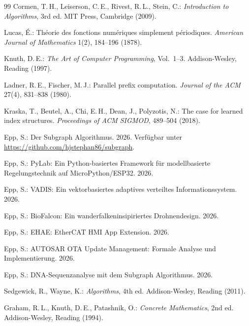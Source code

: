 ﻿\documentclass[12pt, a4paper]{article}
\theoremstyle{plain}
\theoremstyle{definition}
\theoremstyle{remark}
\begin{document}
\begin{thebibliography}{99}
    Cormen, T.\,H., Leiserson, C.\,E., Rivest, R.\,L., Stein, C.:
    \textit{Introduction to Algorithms}, 3rd ed.
    MIT Press, Cambridge (2009).

    Lucas, É.:
    Théorie des fonctions numériques simplement périodiques.
    \textit{American Journal of Mathematics} 1(2), 184--196 (1878).

    Knuth, D.\,E.:
    \textit{The Art of Computer Programming}, Vol.\ 1--3.
    Addison-Wesley, Reading (1997).

    Ladner, R.\,E., Fischer, M.\,J.:
    Parallel prefix computation.
    \textit{Journal of the ACM} 27(4), 831--838 (1980).

    Kraska, T., Beutel, A., Chi, E.\,H., Dean, J., Polyzotis, N.:
    The case for learned index structures.
    \textit{Proceedings of ACM SIGMOD}, 489--504 (2018).

    Epp, S.:
    Der Subgraph Algorithmus. 2026. Verfügbar unter \url{https://github.com/hjstephan86/subgraph}.

    Epp, S.:
    PyLab: Ein Python-basiertes Framework für modellbasierte
    Regelungstechnik auf MicroPython/ESP32. 2026.

    Epp, S.:
    VADIS: Ein vektorbasiertes adaptives verteiltes Informationssystem. 2026.

    Epp, S.:
    BioFalcon: Ein wanderfalkeninsipiriertes Drohnendesign. 2026.

    Epp, S.:
    EHAE: EtherCAT HMI App Extension. 2026.

    Epp, S.:
    AUTOSAR OTA Update Management: Formale Analyse und
    Implementierung. 2026.

    Epp, S.:
    DNA-Sequenzanalyse mit dem Subgraph Algorithmus. 2026.

    Sedgewick, R., Wayne, K.:
    \textit{Algorithms}, 4th ed.
    Addison-Wesley, Reading (2011).

    Graham, R.\,L., Knuth, D.\,E., Patashnik, O.:
    \textit{Concrete Mathematics}, 2nd ed.
    Addison-Wesley, Reading (1994).
\end{thebibliography}
\end{document}
